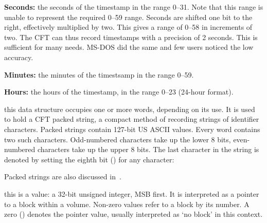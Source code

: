 \begin{description}
    \begin{cbitfield}
    \end{cbitfield}

    \begin{description}
      \item {\bfseries Seconds:} the seconds of the timestamp in the range
        0–31. Note that this range is unable to represent the required 0–59
        range. Seconds are shifted one bit to the right, effectively multiplied
        by two. This gives a range of 0–58 in increments of two. The CFT can
        thus record timestamps with a precision of 2 seconds. This is
        sufficient for many needs. MS-DOS did the same and few users noticed
        the low accuracy.
      \item {\bfseries Minutes:} the minutes of the timestsamp in the range
        0–59.
      \item {\bfseries Hours:} the hours of the timestamp, in the range 0–23
        (24-hour format).
    \end{description}

  \item{} this data structure occupies one or more
    words, depending on its use. It is used to hold a CFT packed string, a
    compact method of recording strings of identifier characters. Packed
    strings contain 127-bit US ASCII values. Every word contains two such
    characters. Odd-numbered characters take up the lower 8 bits, even-numbered
    characters take up the upper 8 bits. The last character in the string is
    denoted by setting the eighth bit () for any character:

    \begin{cbitfield}
    \end{cbitfield}

    Packed strings are also discussed in~.

  \item{} this is a  value: a 32-bit
    unsigned integer, MSB first. It is interpreted as a pointer to a block
    within a volume. Non-zero values refer to a block by its number. A zero
    () denotes the pointer  value, usually
    interpreted as ‘no block’ in this context.
\end{description}

